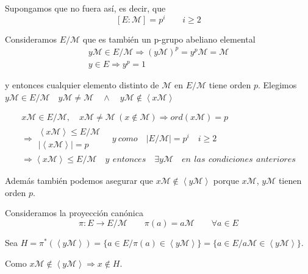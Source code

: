 \documentclass{article}
\begin{document}
\begin{enumerate}[1)]
Supongamos que no fuera así, es decir, que
\begin{equation*}
\left[E:\mathcal{M}\right]=p^i\qquad i\geq 2
\end{equation*}

Consideramos $E/\mathcal{M}$ que es también un p-grupo abeliano elemental
\begin{equation*}
\left.\begin{array}{c}
y\mathcal{M}\in E/\mathcal{M} \Rightarrow (y\mathcal{M})^p=y^p\mathcal{M}=\mathcal{M}\\
y\in E\Rightarrow y^p=1
\end{array} \right.
\end{equation*}

y entonces cualquier elemento distinto de $\mathcal{M}$ en $E/\mathcal{M}$ tiene orden $p$. Elegimos $y\mathcal{M}\in E/\mathcal{M}\quad y\mathcal{M}\neq \mathcal{M}\quad \wedge \quad y\mathcal{M}\notin \left\langle x\mathcal{M}\right\rangle$

\begin{gather*}
x\mathcal{M}\in E/\mathcal{M},\quad x\mathcal{M}\neq \mathcal{M}\:(x\notin \mathcal{M})\Rightarrow ord(x\mathcal{M})=p \\
\Rightarrow \left.\begin{array}{c}
\left\langle x\mathcal{M}\right\rangle \leq E/\mathcal{M}\\
|\left\langle x\mathcal{M}\right\rangle |=p
\end{array}\right. \quad y\:como\quad |E/\mathcal{M}|=p^i\quad i\geq 2 \\
\Rightarrow \left\langle x\mathcal{M}\right\rangle \leq E/\mathcal{M} \quad y\:\,entonces\quad \exists y\mathcal{M}\quad en\:\,las\:\,condiciones\:\,anteriores
\end{gather*}

Además también podemos asegurar que $x\mathcal{M}\notin \left\langle y\mathcal{M}\right\rangle$ porque $x\mathcal{M}$, $y\mathcal{M}$ tienen orden $p$. 

Consideramos la proyección canónica
\begin{equation*}
\pi:E\longrightarrow E/\mathcal{M}\qquad \pi(a)=a\mathcal{M}\qquad \forall a\in E 
\end{equation*}

Sea $H=\pi^*(\left\langle y\mathcal{M}\right\rangle)=\{a\in E/\pi(a)\in \left\langle y\mathcal{M}\right\rangle\}=\{a\in E/a\mathcal{M}\in \left\langle y\mathcal{M}\right\rangle\}$.

Como $x\mathcal{M}\notin \left\langle y\mathcal{M}\right\rangle \Rightarrow x\notin H$.


\end{enumerate}
\end{document}
